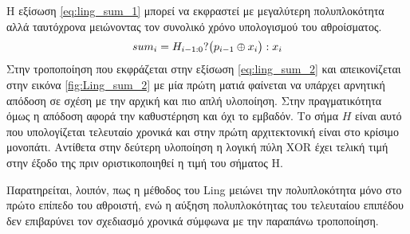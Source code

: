 Η εξίσωση \ref{eq:ling_sum_1} μπορεί να εκφραστεί με μεγαλύτερη πολυπλοκότητα 
αλλά ταυτόχρονα μειώνοντας τον συνολικό χρόνο υπολογισμού του αθροίσματος.
\begin{equation}
\label{eq:ling_sum_2}
\equationame{άθροισμα κατά Ling (2)}
    sum_i = H_{i-1:0} ? \big(p_{i-1} \oplus x_i\big) : x_i
\end{equation}
Στην τροποποίηση που εκφράζεται στην εξίσωση \ref{eq:ling_sum_2} και 
απεικονίζεται στην εικόνα \ref{fig:Ling_sum_2} με μία πρώτη ματιά φαίνεται να 
υπάρχει αρνητική απόδοση σε σχέση με την αρχική και πιο απλή υλοποίηση.
Στην πραγματικότητα όμως η απόδοση αφορά την καθυστέρηση και όχι το εμβαδόν. Το σήμα
$Η$ είναι αυτό που υπολογίζεται τελευταίο χρονικά και στην πρώτη αρχιτεκτονική
είναι στο κρίσιμο μονοπάτι. Αντίθετα στην δεύτερη υλοποίηση η λογική πύλη XOR 
έχει τελική τιμή στην έξοδο της πριν οριστικοποιηθεί η τιμή του σήματος H.

 Παρατηρείται, λοιπόν,  πως η μέθοδος του Ling μειώνει την πολυπλοκότητα μόνο στο πρώτο επίπεδο του αθροιστή, ενώ η αύξηση πολυπλοκότητας του τελευταίου επιπέδου δεν επιβαρύνει τον σχεδιασμό χρονικά σύμφωνα με την παραπάνω τροποποίηση.
 
 
 
 
 
 
 
 
